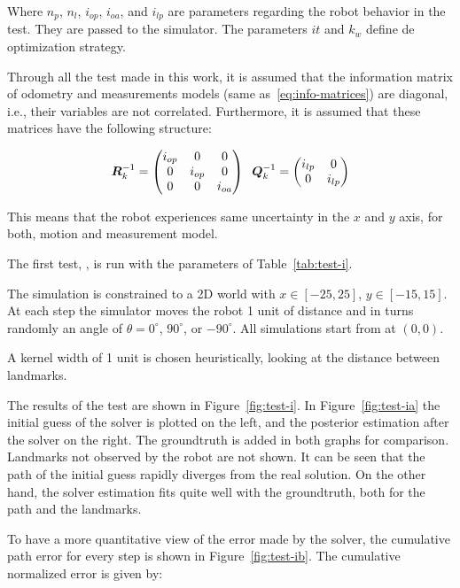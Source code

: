 Where $n_p$, $n_l$, $i_{op}$, $i_{oa}$, and $i_{lp}$ are parameters regarding the robot behavior in the test. They are passed to the simulator. The parameters $it$ and $k_w$ define de optimization strategy.

Through all the test made in this work, it is assumed that the information matrix of odometry and measurements models (same as~\eqref{eq:info-matrices}) are diagonal, i.e., their variables are not correlated. Furthermore, it is assumed that these matrices have the following structure:

\begin{equation}
\boldsymbol{R}^{-1}_k = \begin{pmatrix}
i_{op} & 0 & 0\\
0 & i_{op} & 0\\
0 & 0 & i_{oa}
\end{pmatrix} \;\;
\boldsymbol{Q}^{-1}_k = \begin{pmatrix}
i_{lp} & 0\\
0 & i_{lp}
\end{pmatrix} 
\label{eq:info-matrices-tests}
\end{equation}

This means that the robot experiences same uncertainty in the $x$ and $y$ axis, for both, motion and measurement model. 

The first test, , is run with the parameters of Table~\ref{tab:test-i}. 

The simulation is constrained to a 2D world with $x\in[-25,25]$, $y\in[-15,15]$. At each step the simulator moves the robot 1 unit of distance and in turns randomly an angle of $\theta=0^\circ$, $90^\circ$, or $-90^\circ$. All simulations start from at $(0,0)$.

A kernel width of 1 unit is chosen heuristically, looking at the distance between landmarks. 

The results of the test are shown in Figure~\ref{fig:test-i}. In Figure~\ref{fig:test-ia} the initial guess of the solver is plotted on the left, and the posterior estimation after the solver on the right. The groundtruth is added in both graphs for comparison. Landmarks not observed by the robot are not shown.  It can be seen that the path of the initial guess rapidly diverges from the real solution. On the other hand, the solver estimation fits quite well with the groundtruth, both for the path and the landmarks.

To have a more quantitative view of the error made by the solver, the cumulative path error for every step is shown in Figure~\ref{fig:test-ib}.  The cumulative normalized error is given by:

